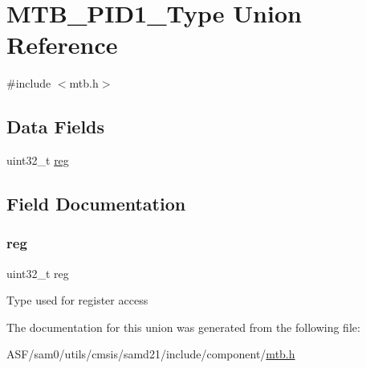 \hypertarget{union_m_t_b___p_i_d1___type}{}\section{M\+T\+B\+\_\+\+P\+I\+D1\+\_\+\+Type Union Reference}
\label{union_m_t_b___p_i_d1___type}


{\ttfamily \#include $<$mtb.\+h$>$}

\subsection*{Data Fields}
\begin{DoxyCompactItemize}
\item 
uint32\+\_\+t \mbox{\hyperlink{union_m_t_b___p_i_d1___type_a6b91636401516a477989a336376d7b40}{reg}}
\end{DoxyCompactItemize}


\subsection{Field Documentation}
\mbox{\label{union_m_t_b___p_i_d1___type_a6b91636401516a477989a336376d7b40}} 
\subsubsection{\texorpdfstring{reg}{reg}}
{\footnotesize\ttfamily uint32\+\_\+t reg}

Type used for register access 

The documentation for this union was generated from the following file\+:\begin{DoxyCompactItemize}
\item 
A\+S\+F/sam0/utils/cmsis/samd21/include/component/\mbox{\hyperlink{component_2mtb_8h}{mtb.\+h}}\end{DoxyCompactItemize}

